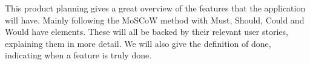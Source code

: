 This product planning gives a great overview of the features that the application will have. Mainly following the MoSCoW method with Must, Should, Could and Would have elements. These will all be backed by their relevant user stories, explaining them in more detail. We will also give the definition of done, indicating when a feature is truly done.